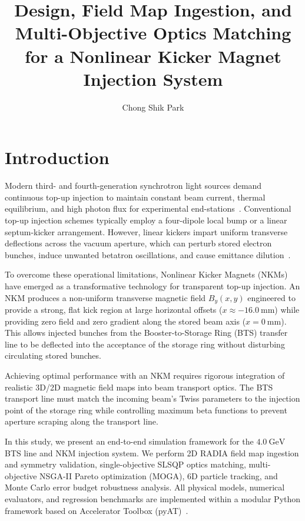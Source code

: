 \documentclass[a4paper,11pt]{article}
\title{Design, Field Map Ingestion, and Multi-Objective Optics Matching for a Nonlinear Kicker Magnet Injection System}
\author[a,1]{Chong Shik Park\note{Corresponding author.}}
\affiliation[a]{Department of Accelerator Science, Korea University, Sejong 30019, South Korea}
\begin{document}
\maketitle
\flushbottom

\section{Introduction}
\label{sec:intro}

Modern third- and fourth-generation synchrotron light sources demand continuous top-up injection to maintain constant beam current, thermal equilibrium, and high photon flux for experimental end-stations~\cite{NKM_Injection_2021, MAXIV_NKM_2018}. Conventional top-up injection schemes typically employ a four-dipole local bump or a linear septum-kicker arrangement. However, linear kickers impart uniform transverse deflections across the vacuum aperture, which can perturb stored electron bunches, induce unwanted betatron oscillations, and cause emittance dilution~\cite{SLS_NKM_2016}.

To overcome these operational limitations, Nonlinear Kicker Magnets (NKMs) have emerged as a transformative technology for transparent top-up injection. An NKM produces a non-uniform transverse magnetic field $B_y(x,y)$ engineered to provide a strong, flat kick region at large horizontal offsets ($x \approx -16.0~\mathrm{mm}$) while providing zero field and zero gradient along the stored beam axis ($x = 0~\mathrm{mm}$). This allows injected bunches from the Booster-to-Storage Ring (BTS) transfer line to be deflected into the acceptance of the storage ring without disturbing circulating stored bunches.

Achieving optimal performance with an NKM requires rigorous integration of realistic 3D/2D magnetic field maps into beam transport optics. The BTS transport line must match the incoming beam's Twiss parameters to the injection point of the storage ring while controlling maximum beta functions to prevent aperture scraping along the transport line.

In this study, we present an end-to-end simulation framework for the $4.0~\mathrm{GeV}$ BTS line and NKM injection system. We perform 2D RADIA field map ingestion and symmetry validation, single-objective SLSQP optics matching, multi-objective NSGA-II Pareto optimization (MOGA), 6D particle tracking, and Monte Carlo error budget robustness analysis. All physical models, numerical evaluators, and regression benchmarks are implemented within a modular Python framework based on Accelerator Toolbox (pyAT)~\cite{PyAT_2019}.
\end{document}
